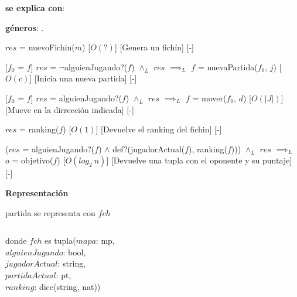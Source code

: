 \documentclass{book}
\begin{document}
    \newpage

    \begin{Interfaz}

        \textbf{se explica con}: 

        \textbf{géneros}: .


        {$res$ = nuevoFichin($m$)}%
        [$O(?)$]
        [Genera un fichín]
        [-]

        [$f_0$ = $f$]
        {$res$ = $\neg$alguienJugando?($f$) $\wedge_L$ $res$ $\implies_L$ $f$ = nuevaPartida($f_0$, $j$) }%
        [$O(c)$]
        [Inicia una nueva partida]
        [-]

        [$f_0$ = $f$]
        {$res$ = alguienJugando?($f$) $\wedge_L$ $res$ $\implies_L$ $f$ = mover($f_0$, $d$) }%
        [$O(|J|)$]
        [Mueve en la dirrección indicada]
        [-]

        {$res$ = ranking($f$)}%
        [$O(1)$]
        [Devuelve el ranking del fichin]
        [-]

        {($res$ = alguienJugando?($f$) $\wedge$ def?(jugadorActual($f$), ranking($f$))) $\wedge_L$ $res$ $\implies_L$ $o$ = objetivo($f$) }%
        [$O(log_2\ n)$]
        [Devuelve una tupla con el oponente y su puntaje]
        [-]

    \end{Interfaz}

    \newpage

    \textbf{Representación}

    partida se representa con $fch$

    $ $

    donde $fch$ es tupla($mapa$: mp, \\
        \text{}\qquad\quad$alguienJugando$: bool, \\
        \text{}\qquad\quad$jugadorActual$: string, \\
        \text{}\qquad\quad$partidaActual$: pt, \\
        \text{}\qquad\quad$ranking$: dicc(string, nat))
\end{document}
